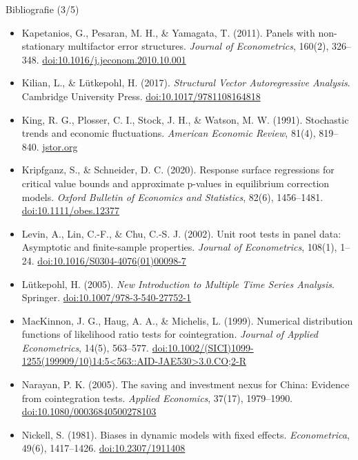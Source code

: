 \begin{frame}{Bibliografie (3/5)}
\itemsize{\tiny}
\begin{itemize}
    \item Kapetanios, G., Pesaran, M. H., \& Yamagata, T. (2011). Panels with non-stationary multifactor error structures. \textit{Journal of Econometrics}, 160(2), 326--348. \href{https://doi.org/10.1016/j.jeconom.2010.10.001}{doi:10.1016/j.jeconom.2010.10.001}
    \item Kilian, L., \& Lütkepohl, H. (2017). \textit{Structural Vector Autoregressive Analysis}. Cambridge University Press. \href{https://doi.org/10.1017/9781108164818}{doi:10.1017/9781108164818}
    \item King, R. G., Plosser, C. I., Stock, J. H., \& Watson, M. W. (1991). Stochastic trends and economic fluctuations. \textit{American Economic Review}, 81(4), 819--840. \href{https://www.jstor.org/stable/2006644}{jstor.org}
    \item Kripfganz, S., \& Schneider, D. C. (2020). Response surface regressions for critical value bounds and approximate p-values in equilibrium correction models. \textit{Oxford Bulletin of Economics and Statistics}, 82(6), 1456--1481. \href{https://doi.org/10.1111/obes.12377}{doi:10.1111/obes.12377}
    \item Levin, A., Lin, C.-F., \& Chu, C.-S. J. (2002). Unit root tests in panel data: Asymptotic and finite-sample properties. \textit{Journal of Econometrics}, 108(1), 1--24. \href{https://doi.org/10.1016/S0304-4076(01)00098-7}{doi:10.1016/S0304-4076(01)00098-7}
    \item Lütkepohl, H. (2005). \textit{New Introduction to Multiple Time Series Analysis}. Springer. \href{https://doi.org/10.1007/978-3-540-27752-1}{doi:10.1007/978-3-540-27752-1}
    \item MacKinnon, J. G., Haug, A. A., \& Michelis, L. (1999). Numerical distribution functions of likelihood ratio tests for cointegration. \textit{Journal of Applied Econometrics}, 14(5), 563--577. \href{https://doi.org/10.1002/(SICI)1099-1255(199909/10)14:5\%3C563::AID-JAE530\%3E3.0.CO\%3B2-R}{doi:10.1002/(SICI)1099-1255(199909/10)14:5\textless{}563::AID-JAE530\textgreater{}3.0.CO;2-R}
    \item Narayan, P. K. (2005). The saving and investment nexus for China: Evidence from cointegration tests. \textit{Applied Economics}, 37(17), 1979--1990. \href{https://doi.org/10.1080/00036840500278103}{doi:10.1080/00036840500278103}
    \item Nickell, S. (1981). Biases in dynamic models with fixed effects. \textit{Econometrica}, 49(6), 1417--1426. \href{https://doi.org/10.2307/1911408}{doi:10.2307/1911408}

\end{itemize}
\end{frame}
